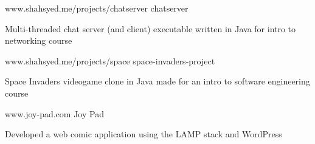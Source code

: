 \begin{cventries}
  \cventry
    {www.shahsyed.me/projects/chatserver}
    {chatserver}
    { }
    { }
    {
      \begin{cvitems}
        \item {Multi-threaded chat server (and client) executable written in Java for intro to networking course}
      \end{cvitems}
    }
    \cventry
    {www.shahsyed.me/projects/space}
    {space-invaders-project}
    { }
    { }
    {
      \begin{cvitems}
        \item {Space Invaders videogame clone in Java made for an intro to software engineering course}
      \end{cvitems}
    }
   \cventry
    {www.joy-pad.com}
    {Joy Pad}
    { }
    { }
    {
      \begin{cvitems}
        \item {Developed a web comic application using the LAMP stack and WordPress}
      \end{cvitems}
    }
\end{cventries}
